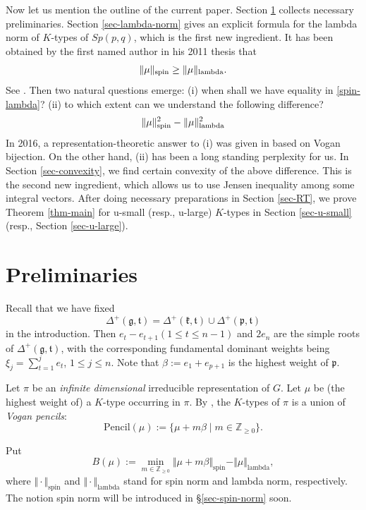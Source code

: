 \documentclass[11pt]{amsart}
\theoremstyle{plain}
\theoremstyle{definition}
\newcommand{\frg}{\mathfrak{g}}
\newcommand{\frk}{\mathfrak{k}}
\newcommand{\frp}{\mathfrak{p}}
\newcommand{\frt}{\mathfrak{t}}
\newcommand{\bbZ}{\mathbb{Z}}
\begin{document}
Now let us mention the outline of the current paper. Section \ref{sec-pre} collects necessary preliminaries. Section \ref{sec-lambda-norm} gives an explicit formula for the lambda norm of $K$-types of $Sp(p, q)$, which is the first new ingredient. It has been obtained by the first named author in his 2011 thesis that
\begin{equation}\label{spin-lambda}
\|\mu\|_{\rm spin} \ge \|\mu\|_{\rm lambda}.
\end{equation}
See \cite{D13}. Then two natural questions emerge: (i) when shall we have equality in \eqref{spin-lambda}?
(ii) to which extent can we understand the following difference?
$$
\|\mu\|_{\rm spin}^2 - \|\mu\|_{\rm lambda}^2
$$
In 2016, a representation-theoretic answer to (i) was given in \cite{DD16} based on Vogan bijection.  On the other hand, (ii) has been a long standing perplexity for us. In Section \ref{sec-convexity}, we find certain convexity of the above difference.  This is the second new ingredient, which allows us to use Jensen inequality among some integral vectors. After doing necessary preparations in Section \ref{sec-RT}, we prove Theorem \ref{thm-main} for u-small (resp., u-large) $K$-types in Section \ref{sec-u-small} (resp., Section \ref{sec-u-large}).



\section{Preliminaries}\label{sec-pre}
Recall that we have fixed
$$
\Delta^+(\frg, \frt)=\Delta^+(\frk, \frt) \cup \Delta^+(\frp, \frt)
$$
in the introduction. Then $e_t-e_{t+1}(1\le t\le n-1)$ and $2e_n$ are the simple roots of $\Delta^+(\frg,\frt)$, with the corresponding fundamental dominant weights being $\xi_j=\sum_{t=1}^j e_t$, $1\le j\le n$. Note that $\beta:=e_1+e_{p+1}$ is the highest weight of $\frp$.



Let $\pi$ be an \emph{infinite dimensional} irreducible representation of $G$. Let $\mu$ be (the highest weight of) a $K$-type occurring in $\pi$. By \cite{V80},  the $K$-types of $\pi$ is a union of \emph{Vogan pencils}:
\begin{equation}
	\mathrm{Pencil}(\mu):=\{\mu+m\beta\mid m\in \bbZ_{\ge 0}\}.
\end{equation}

Put
\[B(\mu):=\min_{m\in\bbZ_{\ge 0}}\Vert \mu+m\beta\Vert_{\mathrm{spin}}-\Vert\mu\Vert_{\mathrm{lambda}},\]
where $\Vert\cdot\Vert_{\mathrm{spin}}$ and $\Vert\cdot\Vert_{\mathrm{lambda}}$ stand for spin norm and lambda norm, respectively. The notion spin norm will be introduced in \S\ref{sec-spin-norm} soon.
\end{document}
